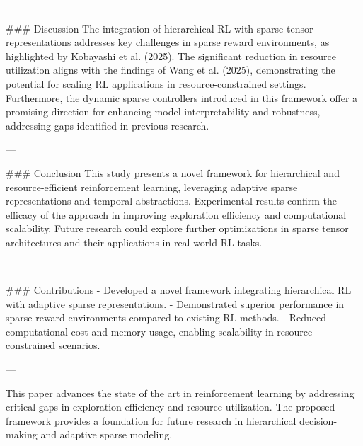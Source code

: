 ---

### Discussion  
The integration of hierarchical RL with sparse tensor representations addresses key challenges in sparse reward environments, as highlighted by Kobayashi et al. (2025). The significant reduction in resource utilization aligns with the findings of Wang et al. (2025), demonstrating the potential for scaling RL applications in resource-constrained settings. Furthermore, the dynamic sparse controllers introduced in this framework offer a promising direction for enhancing model interpretability and robustness, addressing gaps identified in previous research.

---

### Conclusion  
This study presents a novel framework for hierarchical and resource-efficient reinforcement learning, leveraging adaptive sparse representations and temporal abstractions. Experimental results confirm the efficacy of the approach in improving exploration efficiency and computational scalability. Future research could explore further optimizations in sparse tensor architectures and their applications in real-world RL tasks.

---

### Contributions  
- Developed a novel framework integrating hierarchical RL with adaptive sparse representations.
- Demonstrated superior performance in sparse reward environments compared to existing RL methods.
- Reduced computational cost and memory usage, enabling scalability in resource-constrained scenarios.

---

This paper advances the state of the art in reinforcement learning by addressing critical gaps in exploration efficiency and resource utilization. The proposed framework provides a foundation for future research in hierarchical decision-making and adaptive sparse modeling.